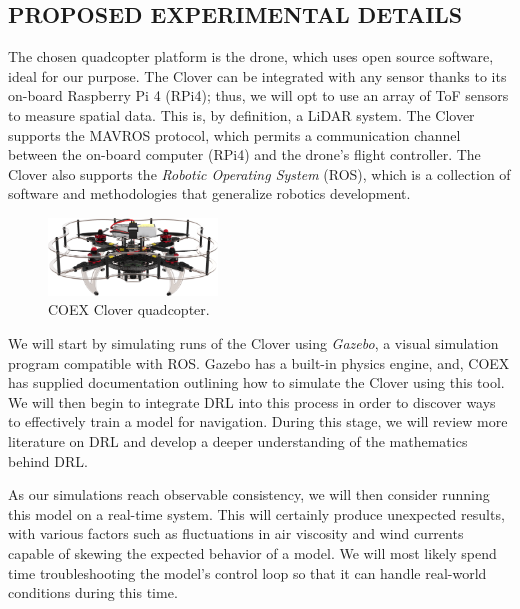 \documentclass[12pt]{article}
\begin{document}
\subsection*{PROPOSED EXPERIMENTAL DETAILS}

The chosen quadcopter platform is the  drone, which uses open source software, ideal for our purpose. \autocite{clover}
The Clover can be integrated with any sensor thanks to its on-board Raspberry Pi 4 (RPi4); thus, we will opt to use an array of ToF sensors to measure spatial data.
This is, by definition, a LiDAR system.
The Clover supports the MAVROS protocol, which permits a communication channel between the on-board computer (RPi4) and the drone's flight controller.
The Clover also supports the \textit{Robotic Operating System} (ROS), which is a collection of software and methodologies that generalize robotics development. \autocite{ros}

\begin{figure}[!h]
  \begin{center}
    \includegraphics[width=0.40\textwidth]{images/clover.png}
    \caption{COEX Clover quadcopter. \autocite{clover}}\label{fig:clover}
  \end{center}
\end{figure}

We will start by simulating runs of the Clover using \textit{Gazebo}, a visual simulation program compatible with ROS. \autocite{gazebo}
Gazebo has a built-in physics engine, and, COEX has supplied documentation outlining how to simulate the Clover using this tool.
We will then begin to integrate DRL into this process in order to discover ways to effectively train a model for navigation.
During this stage, we will review more literature on DRL and develop a deeper understanding of the mathematics behind DRL.

As our simulations reach observable consistency, we will then consider running this model on a real-time system. This will certainly produce unexpected results, with various factors such as fluctuations in air viscosity and wind currents capable of skewing the expected behavior of a model. We will most likely spend time troubleshooting the model's control loop so that it can handle real-world conditions during this time.
\end{document}
